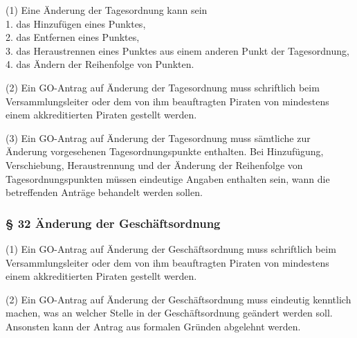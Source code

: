 (1) Eine Änderung der Tagesordnung kann sein \\ 1. das Hinzufügen eines
Punktes, \\ 2. das Entfernen eines Punktes, \\ 3. das Heraustrennen
eines Punktes aus einem anderen Punkt der Tagesordnung, \\ 4. das Ändern
der Reihenfolge von Punkten.

(2) Ein GO-Antrag auf Änderung der Tagesordnung muss schriftlich beim
Versammlungsleiter oder dem von ihm beauftragten Piraten von mindestens
einem akkreditierten Piraten gestellt werden.

(3) Ein GO-Antrag auf Änderung der Tagesordnung muss sämtliche zur
Änderung vorgesehenen Tagesordnungspunkte enthalten. Bei Hinzufügung,
Verschiebung, Heraustrennung und der Änderung der Reihenfolge von
Tagesordnungspunkten müssen eindeutige Angaben enthalten sein, wann die
betreffenden Anträge behandelt werden sollen.

\subsubsection{§ 32 Änderung der Geschäftsordnung}

(1) Ein GO-Antrag auf Änderung der Geschäftsordnung muss schriftlich
beim Versammlungsleiter oder dem von ihm beauftragten Piraten von
mindestens einem akkreditierten Piraten gestellt werden.

(2) Ein GO-Antrag auf Änderung der Geschäftsordnung muss eindeutig
kenntlich machen, was an welcher Stelle in der Geschäftsordnung geändert
werden soll. Ansonsten kann der Antrag aus formalen Gründen abgelehnt
werden.
